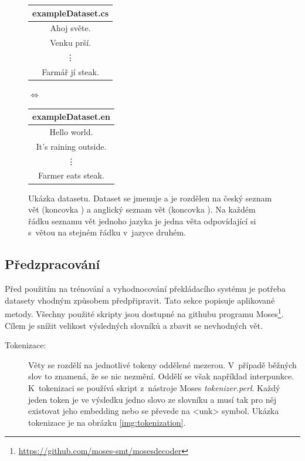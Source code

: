 \begin{figure}[H]
    \begin{center}
        \begin{tabular}{|c|}
          \hline
          exampleDataset.cs\\
          \hline
          Ahoj světe. \\
          Venku prší. \\
          \vdots \\
          Farmář jí steak. \\
          \hline
        \end{tabular}
        $\Longleftrightarrow$
        \begin{tabular}{|c|}
          \hline
          exampleDataset.en\\
          \hline
          Hello world. \\
          It's raining outside. \\
          \vdots \\
          Farmer eats steak. \\
          \hline
        \end{tabular}
    \end{center}
	\caption{Ukázka datasetu. Dataset se jmenuje  a je rozdělen na český seznam vět (koncovka ) a anglický seznam vět (koncovka ). Na každém řádku seznamu vět jednoho jazyka je jedna věta odpovídající si s~větou na stejném řádku v~jazyce druhém.}
	\label{img:dataset}
\end{figure}

\subsection{Předzpracování} \label{subsection:preparing}
Před použitím na trénování a vyhodnocování překládacího systému je potřeba datasety vhodným způsobem předpřipravit. Tato sekce popisuje aplikované metody. Všechny použité skripty jsou dostupné na githubu programu Moses\footnote{\url{https://github.com/moses-smt/mosesdecoder}}. Cílem je snížit velikost výsledných slovníků a zbavit se nevhodných vět.

\begin{description}
  \item[Tokenizace:] Věty se rozdělí na jednotlivé tokeny oddělené mezerou. V~případě běžných slov to znamená, že se nic nezmění. Oddělí se však například interpunkce. K~tokenizaci se používá skript z~nástroje Moses \emph{tokenizer.perl}. Každý jeden token je ve výsledku jedno slovo ze slovníku a musí tak pro něj existovat jeho embedding nebo se převede na <unk> symbol. Ukázka tokenizace je na obrázku \ref{img:tokenization}.
\end{description}

